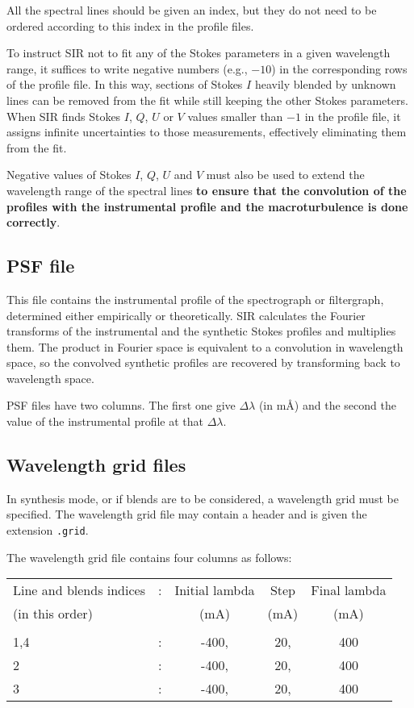 All the spectral lines should be given an index, but they 
do not need to be ordered according to this index in the profile 
files. 

To instruct SIR not to fit any of the Stokes parameters in a
given wavelength range, it suffices to write negative numbers 
(e.g., $-10$) in the corresponding rows of the profile file. In this
way, sections of Stokes $I$ heavily blended by unknown lines can be 
removed from the fit while still keeping the other Stokes parameters. 
When SIR finds Stokes $I$, $Q$, $U$ or $V$ values smaller than $-1$ 
in the profile file, it assigns infinite uncertainties to those 
measurements, effectively eliminating them from the fit. 

Negative values of Stokes $I$, $Q$, $U$ and $V$ must also be used
to extend the wavelength range of the spectral lines {\bf to ensure
that the convolution of the profiles with the instrumental profile
and the macroturbulence is done correctly}.  

\subsection{PSF file}
This file contains the instrumental profile of the spectrograph or
filtergraph, determined either empirically or theoretically. SIR 
calculates the Fourier transforms of the instrumental and the 
synthetic Stokes profiles and multiplies them. The product in 
Fourier space is equivalent to a convolution in wavelength 
space, so the convolved synthetic profiles are recovered 
by transforming back to wavelength space. 

PSF files have two columns. The first one give $\Delta \lambda$ (in
m\AA\/) and the second the value of the instrumental profile at 
that $\Delta \lambda$.

\subsection{Wavelength grid files}
In synthesis mode, or if blends are to be considered, a wavelength grid
must be specified. The wavelength grid file may contain a header and is 
given the extension {\tt .grid}.

The wavelength grid file contains four columns as follows:
\begin{center}
\begin{tabular}{lcccc}
Line and blends indices  & : &  Initial lambda &     Step  &    Final lambda \\
(in this order)          & &          (mA)    &       (mA) &         (mA)  \\
& & & & \\
1,4                      &  : &        -400,  &         20,  &        400 \\
2                        &  : &        -400,  &         20,  &        400 \\ 
3                        &  : &        -400,  &         20,  &        400 \\
\end{tabular}
\end{center} 

